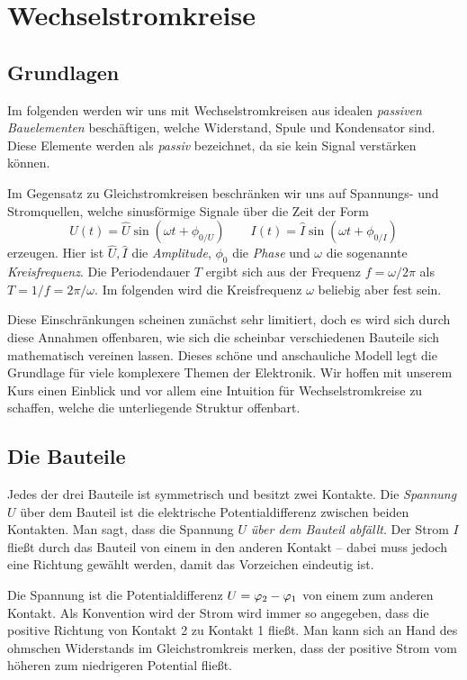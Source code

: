 \newcommand{\mbf}[1]{\ensuremath\mathbf{#1}}
\def\i{\mbf{\kern1pti\kern1pt}}
\section{Wechselstromkreise}
\subsection{Grundlagen}
Im folgenden werden wir uns mit Wechselstromkreisen aus idealen \emph{passiven Bauelementen} beschäftigen, welche
Widerstand, Spule und Kondensator sind. Diese Elemente werden als \emph{passiv} bezeichnet, da sie kein Signal
verstärken können.

Im Gegensatz zu Gleichstromkreisen beschränken wir uns auf Spannungs- und Stromquellen, welche sinusförmige Signale über
die Zeit der Form
\begin{equation}\label{eq:sinusform}
    U(t) = \hat U\sin(\omega t + \phi_{0/U}) \qquad
    I(t) = \hat I\sin(\omega t + \phi_{0/I})
\end{equation}
erzeugen. Hier ist $\hat U, \hat I$ die \emph{Amplitude}, $\phi_0$ die \emph{Phase} und  $\omega$ die sogenannte
\emph{Kreisfrequenz}. Die Periodendauer $T$ ergibt sich aus der Frequenz $f = \omega/2\pi$ als $T = 1/f = 2\pi/\omega$.
Im folgenden wird die Kreisfrequenz $\omega$ beliebig aber fest sein.

Diese Einschränkungen scheinen zunächst sehr limitiert, doch es wird sich durch diese Annahmen offenbaren, wie sich die
scheinbar verschiedenen Bauteile sich mathematisch vereinen lassen. Dieses schöne und anschauliche Modell legt die
Grundlage für viele komplexere Themen der Elektronik. Wir hoffen mit unserem Kurs einen Einblick und vor allem eine
Intuition für Wechselstromkreise zu schaffen, welche die unterliegende Struktur offenbart.

\subsection{Die Bauteile}
Jedes der drei Bauteile ist symmetrisch und besitzt zwei Kontakte. Die \emph{Spannung} $U$ über dem Bauteil ist die
elektrische Potentialdifferenz zwischen beiden Kontakten. Man sagt, dass die Spannung $U$ \emph{über dem Bauteil
abfällt}. Der Strom $I$ fließt durch das Bauteil von einem in den anderen Kontakt -- dabei muss jedoch eine Richtung
gewählt werden, damit das Vorzeichen eindeutig ist.

Die Spannung ist die Potentialdifferenz $U = \oldphi_2 - \oldphi_1$ von einem zum anderen Kontakt. Als Konvention wird der
Strom wird immer so angegeben, dass die positive Richtung von Kontakt 2 zu Kontakt 1 fließt. Man kann sich an Hand des
ohmschen Widerstands im Gleichstromkreis merken, dass der positive Strom vom höheren zum niedrigeren Potential fließt.

